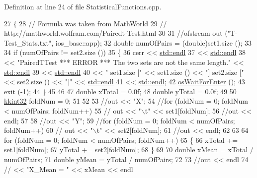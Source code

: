 Definition at line 24 of file Statistical\+Functions.\+cpp.


\begin{DoxyCode}
27 \{
28   \textcolor{comment}{// Formula was taken from MathWorld}
29   \textcolor{comment}{// http://mathworld.wolfram.com/Pairedt-Test.html}
30 
31   \textcolor{comment}{//ofstream  out ("T-Test\_Stats.txt", ios\_base::app);}
32   \textcolor{keywordtype}{double}  numOfPairs = (double)set1.size ();
33 
34   \textcolor{keywordflow}{if}  (numOfPairs != set2.size ())
35   \{
36     cerr << \hyperlink{namespace_k_k_b_ad1f50f65af6adc8fa9e6f62d007818a8}{std::endl}
37          << \hyperlink{namespace_k_k_b_ad1f50f65af6adc8fa9e6f62d007818a8}{std::endl}
38          << \textcolor{stringliteral}{"PairedTTest     *** ERROR ***    The two sets are not the same length."} << 
      \hyperlink{namespace_k_k_b_ad1f50f65af6adc8fa9e6f62d007818a8}{std::endl}
39          << \hyperlink{namespace_k_k_b_ad1f50f65af6adc8fa9e6f62d007818a8}{std::endl}
40          << \textcolor{stringliteral}{"                set1.size ["} << set1.size () << \textcolor{stringliteral}{"]   set2.size ["} << set2.size () << \textcolor{stringliteral}{"]"} << 
      \hyperlink{namespace_k_k_b_ad1f50f65af6adc8fa9e6f62d007818a8}{std::endl}
41          << \hyperlink{namespace_k_k_b_ad1f50f65af6adc8fa9e6f62d007818a8}{std::endl};
42     \hyperlink{namespace_k_k_b_a255aa69aade7f429585349d08973e09f}{osWaitForEnter} ();
43     exit (-1);
44   \}
45                     
46 
47   \textcolor{keywordtype}{double}  xTotal = 0.0f;
48   \textcolor{keywordtype}{double} yTotal = 0.0f;
49 
50   \hyperlink{namespace_k_k_b_a8fa4952cc84fda1de4bec1fbdd8d5b1b}{kkint32}  foldNum = 0;
51 
52 
53   \textcolor{comment}{//out << "X";}
54   \textcolor{comment}{//for  (foldNum = 0;  foldNum < numOfPairs;  foldNum++)}
55   \textcolor{comment}{//  out << "\(\backslash\)t" << set1[foldNum];}
56   \textcolor{comment}{//out << endl;}
57 
58   \textcolor{comment}{//out << "Y";}
59   \textcolor{comment}{//for  (foldNum = 0;  foldNum < numOfPairs;  foldNum++)}
60   \textcolor{comment}{//  out << "\(\backslash\)t" << set2[foldNum];}
61   \textcolor{comment}{//out << endl;}
62 
63 
64   \textcolor{keywordflow}{for}  (foldNum = 0;  foldNum < numOfPairs;  foldNum++)
65   \{
66     xTotal += set1[foldNum];
67     yTotal += set2[foldNum];
68   \}
69 
70   \textcolor{keywordtype}{double}  xMean = xTotal / numOfPairs;
71   \textcolor{keywordtype}{double}  yMean = yTotal / numOfPairs;
72 
73   \textcolor{comment}{//out  << endl}
74   \textcolor{comment}{//     << "X\_Mean = " << xMean << endl}

\end{DoxyCode}
